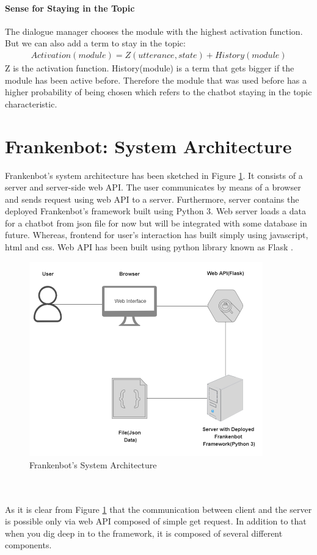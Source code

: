 \paragraph*{Sense for Staying in the Topic}
The dialogue manager chooses the module with the highest activation function. But we can also add a term to stay in the topic: 
\begin{align*}
 Activation(module) = Z(utterance, state) + History(module)
\end{align*} 
Z is the activation function. History(module) is a term that gets bigger if the module has been active before. Therefore the module that was used before has a higher probability of being chosen which refers to the chatbot staying in the topic characteristic.

\section{Frankenbot: System Architecture}
Frankenbot’s system architecture has been sketched in Figure \ref{fig:sysArch}. It consists of a server and server-side web API. The user communicates by means of a browser and sends request using web API to a server. Furthermore, server contains the deployed Frankenbot's framework built using Python 3. Web server loads a data for a chatbot from json file for now but will be integrated with some database in future. Whereas, frontend for user's interaction has built simply using javascript, html and css. Web API has been built using python library known as Flask \cite{flask}. 

\begin{figure}[!h]
    \centering
    \includegraphics[width=0.9\textwidth]{img/System_Architecture_Updated.PNG}
    \caption{Frankenbot's System Architecture}
    \label{fig:sysArch}
\end{figure} 
\\~\\
As it is clear from Figure \ref{fig:sysArch} that the communication between client and the server is possible only via web API composed of simple get request. In addition to that when you dig deep in to the framework, it is composed of several different components.

